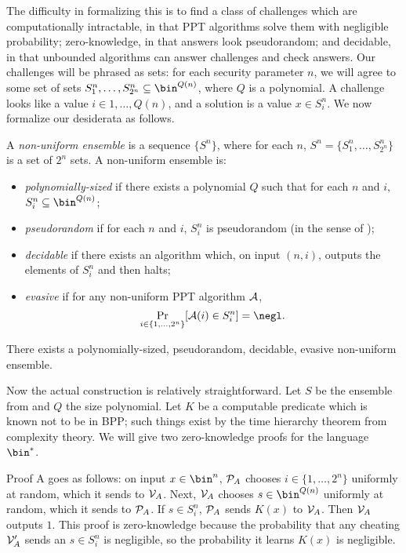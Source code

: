 The difficulty in formalizing this is to find a class of challenges which are
computationally intractable, in that PPT algorithms solve them with negligible
probability; zero-knowledge, in that answers look pseudorandom; and decidable, in
that unbounded algorithms can answer challenges and check answers. Our
challenges will be phrased as sets: for each security parameter $n$, we will
agree to some set of sets $S^n_1, \dots, S^n_{2^n}\subseteq \bin^{Q(n)}$, where
$Q$ is a polynomial. A challenge looks like a value $i\in 1, \dots, Q(n)$, and a
solution is a value $x\in S^n_i$. We now formalize our desiderata as follows.

\begin{dfn}
  A \emph{non-uniform ensemble} is a sequence $\{S^n\}$, where for each $n$,
  $S^n = \{S^n_1, \dots, S^n_{2^n}\}$ is a set of $2^n$ sets. A non-uniform
  ensemble is:
  \begin{itemize}
    \item \emph{polynomially-sized} if there exists a polynomial $Q$ such that
      for each $n$ and $i$, $S^n_i\subseteq \bin^{Q(n)}$;
    \item \emph{pseudorandom} if for each $n$ and $i$, $S^n_i$ is pseudorandom
      (in the sense of );
    \item \emph{decidable} if there exists an algorithm which, on input $(n,
      i)$, outputs the elements of $S^n_i$ and then halts;
    \item \emph{evasive} if for any non-uniform PPT algorithm $\mathcal{A}$, \[
        \Pr_{i\in\{1,\dots,2^n\}}[\cA(i)\in S^n_i] = \negl.
      \]
  \end{itemize}
\end{dfn}

\begin{thm}\label{thm:evasive-sets}
  There exists a polynomially-sized, pseudorandom, decidable, evasive
  non-uniform ensemble.
\end{thm}

Now the actual construction is relatively straightforward. Let $S$ be the
ensemble from 
and $Q$ the
size polynomial. Let $K$ be a computable predicate which is known not to be in
BPP; such things exist by the time hierarchy theorem from complexity theory. We
will give two zero-knowledge proofs for the language $\bin^*$.

Proof A goes as follows: on input $x\in\bin^n$, $\mathcal{P}_A$ chooses $i\in\{1,\dots,2^n\}$ uniformly
at random, which it sends to $\mathcal{V}_A$. Next, $\mathcal{V}_A$ chooses $s\in\bin^{Q(n)}$
uniformly at random, which it sends to $\mathcal{P}_A$. If $s\in S^n_i$, $\mathcal{P}_A$ sends
$K(x)$ to $\mathcal{V}_A$. Then $\mathcal{V}_A$ outputs $1$. This proof is zero-knowledge
because the probability that any cheating $\mathcal{V}'_A$ sends an $s\in S^n_i$ is
negligible, so the probability it learns $K(x)$ is negligible.


